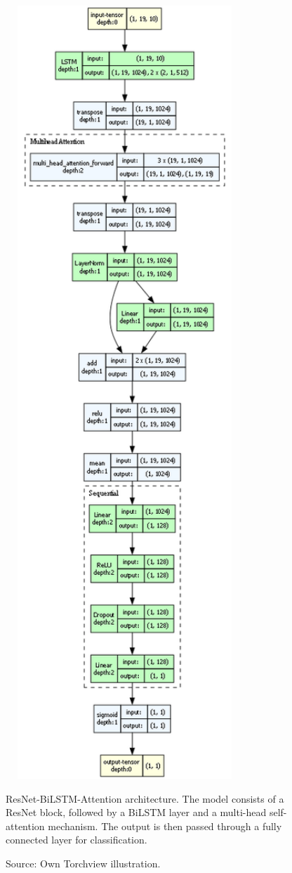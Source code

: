 \begin{figure}[htbp]
  \centering
  \includegraphics[width=0.8\textwidth]{figures/architecture.png}
  \caption{ResNet-BiLSTM-Attention architecture. The model consists of a ResNet block, followed by a BiLSTM layer and a multi-head self-attention mechanism. The output is then passed through a fully connected layer for classification.}
  \label{fig:DSR}
  \caption*{Source: Own Torchview illustration.}
\end{figure}


